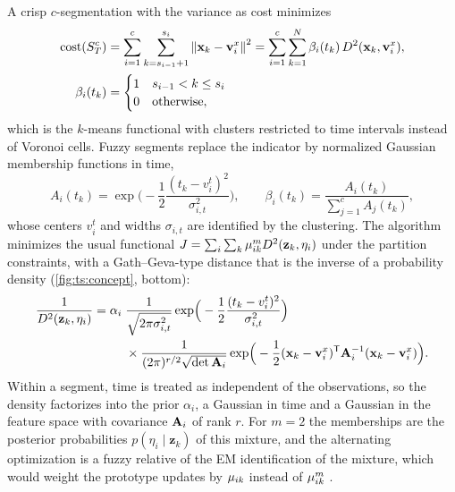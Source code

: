 A crisp $c$-segmentation with the variance as cost minimizes
\begin{equation}
  \begin{aligned}
  \mathrm{cost}(S^c_T)&=\sum_{i=1}^{c}\sum_{k=s_{i-1}+1}^{s_i}\left\lVert \mathbf{x}_k-\mathbf{v}^x_i \right\rVert^2=\sum_{i=1}^{c}\sum_{k=1}^{N}\beta_i(t_k)\,D^2(\mathbf{x}_k,\mathbf{v}^x_i),\\
  \beta_i(t_k)&=\begin{cases}1 & s_{i-1}<k\le s_i\\ 0 & \text{otherwise},\end{cases}
  \end{aligned}
  \label{eq:ts:crispcost}
\end{equation}
which is the $k$-means functional with clusters restricted to time intervals instead of Voronoi cells. Fuzzy segments replace the indicator by normalized Gaussian membership functions in time,
\begin{equation}
  A_i(t_k)=\exp\!\Big(-\frac12\frac{(t_k-v^t_i)^2}{\sigma^2_{i,t}}\Big),\qquad
  \beta_i(t_k)=\frac{A_i(t_k)}{\sum_{j=1}^{c}A_j(t_k)},
  \label{eq:ts:timemf}
\end{equation}
whose centers $v^t_i$ and widths $\sigma_{i,t}$ are identified by the clustering. The algorithm minimizes the usual functional $J=\sum_i\sum_k\mu_{ik}^m D^2(\mathbf{z}_k,\eta_i)$ under the partition constraints, with a Gath--Geva-type distance that is the inverse of a probability density (\cref{fig:ts:concept}, bottom):
\begin{equation}
  \begin{aligned}
  \frac{1}{D^2(\mathbf{z}_k,\eta_i)}=\alpha_i\;&
  \frac{1}{\sqrt{2\pi\sigma^2_{i,t}}}\exp\!\Big(-\frac12\frac{(t_k-v^t_i)^2}{\sigma^2_{i,t}}\Big)\\
  &\times\frac{1}{(2\pi)^{r/2}\sqrt{\det\mathbf{A}_i}}\exp\!\Big(-\frac12(\mathbf{x}_k-\mathbf{v}^x_i)^{\mathsf{T}}\mathbf{A}_i^{-1}(\mathbf{x}_k-\mathbf{v}^x_i)\Big).
  \end{aligned}
  \label{eq:ts:segdist}
\end{equation}
Within a segment, time is treated as independent of the observations, so the density factorizes into the prior $\alpha_i$, a Gaussian in time and a Gaussian in the feature space with covariance $\mathbf{A}_i$ of rank $r$. For $m=2$ the memberships are the posterior probabilities $p(\eta_i\mid\mathbf{z}_k)$ of this mixture, and the alternating optimization is a fuzzy relative of the EM identification of the mixture, which would weight the prototype updates by $\mu_{ik}$ instead of $\mu_{ik}^m$ \cite{gath:1989,abonyi:2002:mgg}.

